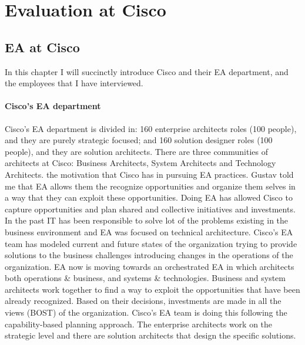 
\chapter{Evaluation at Cisco} %

\label{Chapter5} %



\section{EA at Cisco}

In this chapter I will succinctly introduce Cisco and their EA department, and the employees that I have interviewed.


\subsubsection*{Cisco's EA department}
Cisco's EA department is divided in: 160 enterprise architects roles (100 people), and they are purely strategic focused; and 160 solution designer roles (100 people), and they are solution architects.
There are three communities of architects at Cisco: Business Architects, System Architects and Technology Architects.
 the motivation that Cisco has in pursuing EA practices. Gustav told me that EA allows them the recognize opportunities and organize them selves in a way that they can exploit these opportunities.
Doing EA has allowed Cisco to capture opportunities and plan shared and collective initiatives and investments.
In the past IT has been responsible to solve lot of the problems existing in the business environment and EA was focused on technical architecture. Cisco's EA team has modeled current and future states of the organization trying to provide solutions to the business challenges introducing changes in the operations of the organization.
EA now is moving towards an orchestrated EA in which architects both operations \& business, and systems \& technologies. Business and system architects work together to find a way to exploit the opportunities that have been already recognized.
Based on their decisions, investments are made in all the views (BOST) of the organization.
Cisco's EA team is doing this following the capability-based planning approach. The enterprise architects work on the strategic level and there are solution architects that design the specific solutions.

